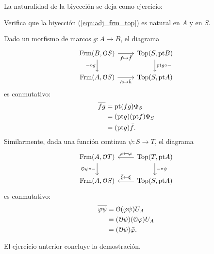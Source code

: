 La naturalidad de la biyección se deja como ejercicio:
\begin{exe}%
    Verifica que la biyección (\ref{eqn:adj_frm_top})
    es natural en $A$ y en $S$.
\end{exe}
\begin{sol}
    Dado un morfismo de marcos $g:A\to B$, el diagrama
    \[
        \begin{tikzcd}
            \Frm(B,\cal OS) \ar[d,"{-}\circ g"'] \ar[r,"f\mapsto\bar f"']
            & \Top(S,\pt B)
            \ar[d,"\pt g\circ{-}"]
            \\
            \Frm(A,\cal OS) \ar[r,"h\mapsto\bar h"']
            & \Top(S,\pt A)
        \end{tikzcd}
    \]
    es conmutativo:
    \begin{align*}
        \overline{fg}
        &= \mathrm{pt}(fg)\Phi_S \\
        &= (\mathrm{pt} g)(\mathrm{pt} f)\Phi_S \\
        &= (\mathrm{pt} g)\bar f.
    \end{align*}
    Similarmente, dada una función continua $\psi:S\to T$,
    el diagrama
    \[
        \begin{tikzcd}
            \Frm(A,\cal OT)
            \ar[d,"\cal O\psi\circ{-}"']
            & \Top(T,\pt A) \ar[l,"\bar \phi\mapsfrom \phi"']
            \ar[d,"{-}\circ \psi"]
            \\
            \Frm(A,\cal OS)
            & \Top(S,\pt A) \ar[l,"\bar \xi\mapsfrom \xi"']
        \end{tikzcd}
    \]
    es conmutativo:
    \begin{align*}
        \overline{\varphi\psi}
        &= \mathcal{O}(\varphi\psi)U_A \\
        &= (\mathcal{O}\psi)(\mathcal{O}\varphi)U_A \\
        &= (\mathcal{O}\psi)\bar{\varphi}.
    \end{align*}
\end{sol}
El ejercicio anterior concluye la demostración.

